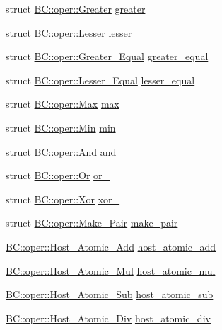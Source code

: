 \begin{DoxyCompactItemize}
\item 
struct \hyperlink{structBC_1_1oper_1_1Greater}{B\+C\+::oper\+::\+Greater} \hyperlink{namespaceBC_1_1oper_af5ef8fa5bdbcc6c9ba435b8dd6b71d17}{greater}
\item 
struct \hyperlink{structBC_1_1oper_1_1Lesser}{B\+C\+::oper\+::\+Lesser} \hyperlink{namespaceBC_1_1oper_a832fb908c1469df64b2f41fb2240a20c}{lesser}
\item 
struct \hyperlink{structBC_1_1oper_1_1Greater__Equal}{B\+C\+::oper\+::\+Greater\+\_\+\+Equal} \hyperlink{namespaceBC_1_1oper_a19804195e59fcb7d379f907051eadfa8}{greater\+\_\+equal}
\item 
struct \hyperlink{structBC_1_1oper_1_1Lesser__Equal}{B\+C\+::oper\+::\+Lesser\+\_\+\+Equal} \hyperlink{namespaceBC_1_1oper_ae2c9aad2cce5442ac9e8941b3cf4d8d6}{lesser\+\_\+equal}
\item 
struct \hyperlink{structBC_1_1oper_1_1Max}{B\+C\+::oper\+::\+Max} \hyperlink{namespaceBC_1_1oper_a13b71b59ec554155c3d0a8667f181a0a}{max}
\item 
struct \hyperlink{structBC_1_1oper_1_1Min}{B\+C\+::oper\+::\+Min} \hyperlink{namespaceBC_1_1oper_a6de199c9caa3c7b2cfcd65e5de942260}{min}
\item 
struct \hyperlink{structBC_1_1oper_1_1And}{B\+C\+::oper\+::\+And} \hyperlink{namespaceBC_1_1oper_af41879d72b034200adc95b5c93892b4c}{and\+\_\+}
\item 
struct \hyperlink{structBC_1_1oper_1_1Or}{B\+C\+::oper\+::\+Or} \hyperlink{namespaceBC_1_1oper_a104ba11d7139cc2e0161e9590c21eb0f}{or\+\_\+}
\item 
struct \hyperlink{structBC_1_1oper_1_1Xor}{B\+C\+::oper\+::\+Xor} \hyperlink{namespaceBC_1_1oper_ab035884cdae6f86f0c3823fe8aef7f1f}{xor\+\_\+}
\item 
struct \hyperlink{structBC_1_1oper_1_1Make__Pair}{B\+C\+::oper\+::\+Make\+\_\+\+Pair} \hyperlink{namespaceBC_1_1oper_a33f7b39d30053636d0aee94d1ba02e1f}{make\+\_\+pair}
\item 
\hyperlink{structBC_1_1oper_1_1Host__Atomic__Add}{B\+C\+::oper\+::\+Host\+\_\+\+Atomic\+\_\+\+Add} \hyperlink{namespaceBC_1_1oper_a6c6339896c767eef7d11899378390b11}{host\+\_\+atomic\+\_\+add}
\item 
\hyperlink{structBC_1_1oper_1_1Host__Atomic__Mul}{B\+C\+::oper\+::\+Host\+\_\+\+Atomic\+\_\+\+Mul} \hyperlink{namespaceBC_1_1oper_ab69bb0d552dad6ac99fec2c4d4223f1d}{host\+\_\+atomic\+\_\+mul}
\item 
\hyperlink{structBC_1_1oper_1_1Host__Atomic__Sub}{B\+C\+::oper\+::\+Host\+\_\+\+Atomic\+\_\+\+Sub} \hyperlink{namespaceBC_1_1oper_a7adeec097938862381d9ff776f549e22}{host\+\_\+atomic\+\_\+sub}
\item 
\hyperlink{structBC_1_1oper_1_1Host__Atomic__Div}{B\+C\+::oper\+::\+Host\+\_\+\+Atomic\+\_\+\+Div} \hyperlink{namespaceBC_1_1oper_afef3fd9e39979a93c67a2365b0639636}{host\+\_\+atomic\+\_\+div}
\end{DoxyCompactItemize}


